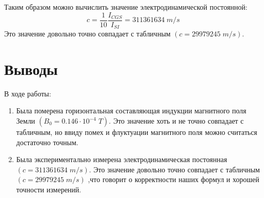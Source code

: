 \documentclass{article}
\begin{document}
Таким образом можно вычислить значение электродинамической постоянной:
\[ c = \frac{1}{10}\frac{I_{CGS}}{I_{SI}} = 311361634\; m/s \]
Это значение довольно точно совпадает с табличным \( (c = 29979245\; m/s) \).
\section{Выводы}
В ходе работы:
\begin{enumerate}
    \item Была померена горизонтальная составляющая индукции магнитного поля Земли \( (B_0 = 0.146\cdot10^{-4}\; T) \). Это значение хоть и не точно
совпадает с табличным, но ввиду помех и флуктуации магнитного поля можно считаться достаточно точным.
    \item Была экспериментально измерена электродинамическая постоянная \((c = 311361634\; m/s)\). Это значение довольно точно совпадает с табличным \( (c = 29979245\; m/s) \) ,что говорит о корректности наших формул
    и хорошей точности измерений.
\end{enumerate}
\end{document}
